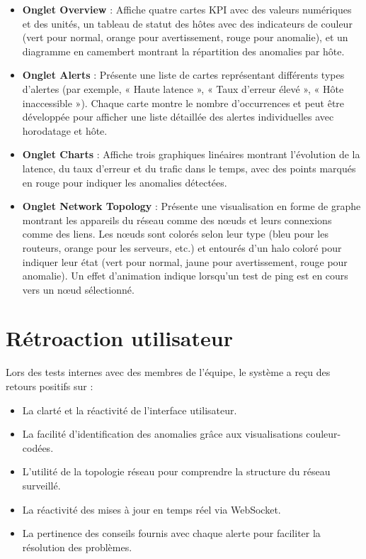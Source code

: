 \documentclass[12pt,a4paper]{report}
\begin{document}
\begin{itemize}
    \item \textbf{Onglet Overview} : Affiche quatre cartes KPI avec des valeurs numériques et des unités, un tableau de statut des hôtes avec des indicateurs de couleur (vert pour normal, orange pour avertissement, rouge pour anomalie), et un diagramme en camembert montrant la répartition des anomalies par hôte.
    \item \textbf{Onglet Alerts} : Présente une liste de cartes représentant différents types d'alertes (par exemple, « Haute latence », « Taux d'erreur élevé », « Hôte inaccessible »). Chaque carte montre le nombre d'occurrences et peut être développée pour afficher une liste détaillée des alertes individuelles avec horodatage et hôte.
    \item \textbf{Onglet Charts} : Affiche trois graphiques linéaires montrant l'évolution de la latence, du taux d'erreur et du trafic dans le temps, avec des points marqués en rouge pour indiquer les anomalies détectées.
    \item \textbf{Onglet Network Topology} : Présente une visualisation en forme de graphe montrant les appareils du réseau comme des nœuds et leurs connexions comme des liens. Les nœuds sont colorés selon leur type (bleu pour les routeurs, orange pour les serveurs, etc.) et entourés d'un halo coloré pour indiquer leur état (vert pour normal, jaune pour avertissement, rouge pour anomalie). Un effet d'animation indique lorsqu'un test de ping est en cours vers un nœud sélectionné.
\end{itemize}

\section{Rétroaction utilisateur}
Lors des tests internes avec des membres de l'équipe, le système a reçu des retours positifs sur :
\begin{itemize}
    \item La clarté et la réactivité de l'interface utilisateur.
    \item La facilité d'identification des anomalies grâce aux visualisations couleur-codées.
    \item L'utilité de la topologie réseau pour comprendre la structure du réseau surveillé.
    \item La réactivité des mises à jour en temps réel via WebSocket.
    \item La pertinence des conseils fournis avec chaque alerte pour faciliter la résolution des problèmes.
\end{itemize}
\end{document}
